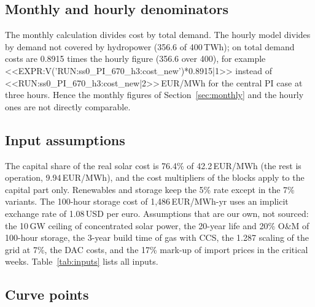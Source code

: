 \subsection{Monthly and hourly denominators}\label{app:denom}
The monthly calculation divides cost by total demand. The hourly model divides by demand not covered by hydropower (356.6 of 400\,TWh); on total demand costs are 0.8915 times the hourly figure (356.6 over 400), for example <<EXPR:V('RUN:ss0_PI_670_h3:cost_new')*0.8915|1>> instead of <<RUN:ss0_PI_670_h3:cost_new|2>>\,EUR/MWh for the central PI case at three hours. Hence the monthly figures of Section~\ref{sec:monthly} and the hourly ones are not directly comparable.

\subsection{Input assumptions}\label{app:decl}
The capital share of the real solar cost is 76.4\% of 42.2\,EUR/MWh (the rest is operation, 9.94\,EUR/MWh), and the cost multipliers of the blocks apply to the capital part only. Renewables and storage keep the 5\% rate except in the 7\% variants. The 100-hour storage cost of 1{,}486\,EUR/MWh-yr uses an implicit exchange rate of 1.08\,USD per euro. Assumptions that are our own, not sourced: the 10\,GW ceiling of concentrated solar power, the 20-year life and 20\% O\&M of 100-hour storage, the 3-year build time of gas with CCS, the 1.287 scaling of the grid at 7\%, the DAC costs, and the 17\% mark-up of import prices in the critical weeks. Table~\ref{tab:inputs} lists all inputs.

\subsection{Curve points}
\begin{table}[htbp]
\centering
\caption{The curve under net self-sufficiency at 5\%, six-hour step, with the equivalent construction cost at seven years: system cost (EUR/MWh), nuclear capacity (GW) and share of total demand (\%), PI and OB.}\label{tab:curve5}

\end{table}

\begin{table}[htbp]
\centering
\caption{The curve under net self-sufficiency at 7\%, with imports with a capacity credit at 5\% and 7\%, and without imports at 5\% and 7\%, six-hour step.}\label{tab:other}

\end{table}

\begin{table}[htbp]
\centering
\caption{From the previous model to the present one, OB case, six hours, cumulative; cost in EUR/MWh.}\label{tab:bridgeob}

\end{table}
